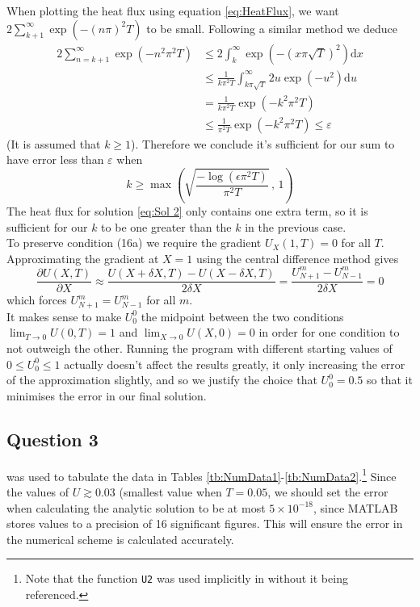 \documentclass[10pt,a4paper,notitlepage]{article}
\begin{document}
When plotting the heat flux using equation \eqref{eq:HeatFlux}, we want $2\sum_{k+1}^{\infty}\exp\left(-(n\pi)^{2}T\right)$ to be small. Following a similar method we deduce 
\begin{equation}
\begin{aligned}
2\sum_{n=k+1}^{\infty}\exp\left(-n^{2}\pi^{2}T\right) &\leq  2\int^{\infty}_{k}\exp\left(-\left(x\pi\sqrt{T}\right)^{2}\right)\mathrm{d}x\\ &\leq \frac{1}{k \pi^{2}T}\int_{k\pi\sqrt{T}}^{\infty}2u\exp\left(-u^{2}\right)\mathrm{d}u \\ &=\frac{1}{k\pi^{2}T}\exp\left(-k^{2}\pi^{2}T\right) \\ &\leq \frac{1}{\pi^{2}T}\exp\left(-k^{2}\pi^{2}T\right) \leq \varepsilon
\end{aligned}
\end{equation} 
(It is assumed that $k\geq 1$). Therefore we conclude it's sufficient for our sum to have error less than $\varepsilon$ when \begin{equation}
k\geq \max\left(\sqrt{\frac{-\log\left(\epsilon\pi^{2}T\right)}{\pi^{2}T}}\, ,\,1\right)
\end{equation}
The heat flux for solution \eqref{eq:Sol 2} only contains one extra term, so it is sufficient for our $k$ to be one greater than the $k$ in the previous case.\\ 


To preserve condition (16a) we require the gradient $U_{X}(1,T)=0$ for all $T$. Approximating the gradient at $X=1$ using the central difference method gives 
\begin{equation}
\frac{\partial U(X,T)}{\partial X}\approx\frac{U(X+\delta X,T)-U(X-\delta X,T)}{2\delta X}=\frac{U_{N+1}^{m}-U_{N-1}^{m}}{2\delta X}=0
\end{equation}
which forces $U_{N+1}^{m}=U_{N-1}^{m}$ for all $m$. \\

It makes sense to make $U_{0}^{0}$ the midpoint between the two conditions $\lim_{T\rightarrow 0}U(0,T)=1$ and $\lim_{X\rightarrow 0}U(X,0)=0$ in order for one condition to not outweigh the other. Running the program with different starting values of $0\leq U_{0}^{0}\leq 1$ actually doesn't affect the results greatly, it only increasing the error of the approximation slightly, and so we justify the choice that $U_{0}^{0}=0.5$ so that it minimises the error in our final solution.


\subsection*{\centering Question 3}
 was used to tabulate the data in Tables \ref{tb:NumData1}-\ref{tb:NumData2}.\footnote{Note that the function \texttt{U2} was used implicitly in  without it being referenced.} Since the values of $U\gtrsim 0.03$ (smallest value when $T=0.05$, we should set the error when calculating the analytic solution to be at most $5\times10^{-18}$, since MATLAB stores values to a precision of 16 significant figures.  This will ensure the error in the numerical scheme is calculated accurately. 
\end{document}

